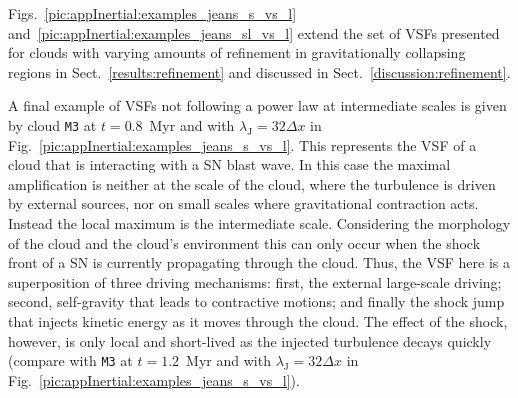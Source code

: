 Figs.~\ref{pic:appInertial:examples_jeans_s_vs_l} and~\ref{pic:appInertial:examples_jeans_sl_vs_l} extend the set of VSFs presented for clouds with varying amounts of refinement in gravitationally collapsing regions in Sect.~\ref{results:refinement} and discussed in Sect.~\ref{discussion:refinement}.

A final example of VSFs not following a power law at intermediate scales is given by cloud \texttt{M3} at $t=0.8$~Myr and with $\lambda_\mathrm{J} = 32\Delta x$ in Fig.~\ref{pic:appInertial:examples_jeans_s_vs_l}.
This represents the VSF of a cloud that is interacting with a SN blast wave.
In this case the maximal amplification is neither at the scale of the cloud, where the turbulence is driven by external sources, nor on small scales where gravitational contraction acts.
Instead the local maximum is the intermediate scale. 
Considering the morphology of the cloud and the cloud's environment this can only occur when the shock front of a SN is currently propagating through the cloud. 
Thus, the VSF here is a superposition of three driving mechanisms:
first, the external large-scale driving; second, self-gravity that leads to contractive motions; and finally the shock jump that injects kinetic energy as it moves through the cloud. 
The effect of the shock, however, is only local and short-lived as the injected turbulence decays quickly (compare with \texttt{M3} at $t=1.2$~Myr and with $\lambda_\mathrm{J} = 32\Delta x$ in Fig.~\ref{pic:appInertial:examples_jeans_s_vs_l}).












